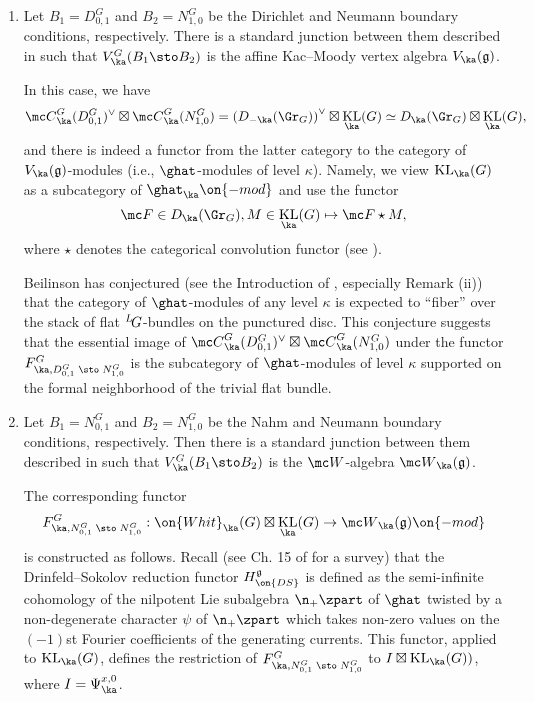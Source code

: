 \documentclass[11pt,reqno]{amsart}
\theoremstyle{plain}
\numberwithin{equation}{section}
\newcommand{\g}{\mathfrak{g}}
\def\neg{\negthinspace}
\def\LG{{}^L\neg G}
\DeclareMathOperator{\KL}{KL}
\theoremstyle{definition}
\begin{document}
\begin{enumerate}

\item Let $B_1=D^G_{0,1}$ and $B_2=N^G_{1,0}$ be the Dirichlet and Neumann
  boundary conditions, respectively. There is a standard junction
  between them described in \cite{CG} such that
  $V^G_\ka(B_1\sto B_2)$ is the affine Kac--Moody vertex algebra
  $V_\ka(\g)$.

In this case, we have
$$
{\mc C}^G_\ka(D^G_{0,1})^\vee \boxtimes {\mc C}^G_\ka(N^G_{1,0}) =
\left(D_{-\ka}(\Gr_G)\right)^\vee \boxtimes \KL_\ka(G)
\simeq D_\ka(\Gr_G) \boxtimes \KL_\ka(G),
$$
and there is indeed a functor from the latter category to the category
of $V_\ka(\g)$-modules (i.e., $\ghat$-modules of level
$\kappa$). Namely, we view $\KL_\ka(G)$ as a subcategory of
$\ghat_\ka\on{-mod}$ and use the functor
\begin{equation}    \label{star}
{\mc F} \in D_\ka(\Gr_G), M \in \KL_\ka(G) \mapsto {\mc
  F} \star M,
\end{equation}
where $\star$ denotes the categorical convolution functor (see
\cite{BD,FG}).

Beilinson has conjectured (see the Introduction of \cite{Bei},
especially Remark (ii)) that the category of $\ghat$-modules of any
level $\kappa$ is expected to ``fiber'' over the stack of flat
$\LG$-bundles on the punctured disc. This conjecture suggests that the
essential image of ${\mc C}^G_\ka(D^G_{0,1})^\vee \boxtimes {\mc
  C}^G_\ka(N^G_{1,0})$ under the functor $F^G_{\ka,D^G_{0,1}\; \sto
\; N^G_{1,0}}$ is the subcategory of $\ghat$-modules of level $\kappa$
supported on the formal neighborhood of the trivial flat bundle.

\bigskip

\item Let $B_1=N^G_{0,1}$ and $B_2=N^G_{1,0}$ be the Nahm and Neumann
  boundary conditions, respectively. Then there is a standard junction
  between them described in \cite{NW,GR,CG} such that $V^G_\ka(B_1\sto B_2)$
  is the ${\mc W}$-algebra ${\mc W}_\ka(\g)$.

The corresponding functor
$$
F^G_{\ka,N^G_{0,1}\; \sto \; N^G_{1,0}}: \on{Whit}_{\ka}(G) \boxtimes
\KL_\ka(G) \to {\mc W}_\ka(\g)\on{-mod}
$$
is constructed as follows. Recall \cite{FF,FKW} (see Ch. 15 of
\cite{FB} for a survey) that the Drinfeld--Sokolov reduction functor
$H^{\g}_{\on{DS}}$ is defined as the semi-infinite cohomology of the
nilpotent Lie subalgebra $\n_+\zpart$ of $\ghat$ twisted by a
non-degenerate character $\psi$ of $\n_+\zpart$ which takes non-zero
values on the $(-1)$st Fourier coefficients of the generating
currents. This functor, applied to $\KL_\ka(G)$, defines the
restriction of $F^G_{\ka,N^G_{0,1}\; \sto \; N^G_{1,0}}$ to $I
\boxtimes \KL_\ka(G))$, where $I=\Psi^{x,0}_\ka$.


\end{enumerate}
\end{document}

